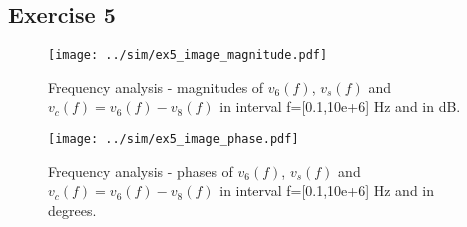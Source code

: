 \subsection{Exercise 5} \label{sec:Ex5Sim}

\begin{figure}[H]
  \centering
  \texttt{[image: ../sim/ex5\_image\_magnitude.pdf]}
  \caption{Frequency analysis - magnitudes of $v_6(f)$, $v_s(f)$ and $v_c(f)=v_6(f)-v_8(f)$ in interval f=[0.1,10e+6] Hz and in dB.}
  \label{fig:Ex5_Image_Magnitude}
\end{figure}

\begin{figure}[H]
  \centering
  \texttt{[image: ../sim/ex5\_image\_phase.pdf]}
  \caption{Frequency analysis - phases of $v_6(f)$, $v_s(f)$ and $v_c(f)=v_6(f)-v_8(f)$ in interval f=[0.1,10e+6] Hz and in degrees.}
  \label{fig:Ex5_Image_Phase}
\end{figure}
